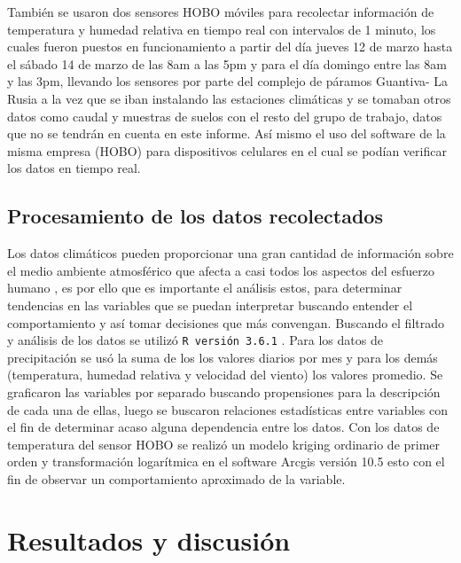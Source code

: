 \documentclass[conference,final,]{IEEEtran}
\begin{document}
También se usaron dos sensores HOBO móviles para recolectar información
de temperatura y humedad relativa en tiempo real con intervalos de 1
minuto, los cuales fueron puestos en funcionamiento a partir del día
jueves 12 de marzo hasta el sábado 14 de marzo de las 8am a las 5pm y
para el día domingo entre las 8am y las 3pm, llevando los sensores por
parte del complejo de páramos Guantiva- La Rusia a la vez que se iban
instalando las estaciones climáticas y se tomaban otros datos como
caudal y muestras de suelos con el resto del grupo de trabajo, datos que
no se tendrán en cuenta en este informe. Así mismo el uso del software
de la misma empresa (HOBO) para dispositivos celulares en el cual se
podían verificar los datos en tiempo real.

\hypertarget{procesamiento-de-los-datos-recolectados}{%
\subsection{Procesamiento de los datos
recolectados}\label{procesamiento-de-los-datos-recolectados}}

Los datos climáticos pueden proporcionar una gran cantidad de
información sobre el medio ambiente atmosférico que afecta a casi todos
los aspectos del esfuerzo humano \cite{Bala}, es por ello que es
importante el análisis estos, para determinar tendencias en las
variables que se puedan interpretar buscando entender el comportamiento
y así tomar decisiones que más convengan. Buscando el filtrado y
análisis de los datos se utilizó \texttt{R\ versión\ 3.6.1} \cite{Rs}. Para los
datos de precipitación se usó la suma de los los valores diarios por mes
y para los demás (temperatura, humedad relativa y velocidad del viento)
los valores promedio. Se graficaron las variables por separado buscando
propensiones para la descripción de cada una de ellas, luego se buscaron
relaciones estadísticas entre variables con el fin de determinar acaso
alguna dependencia entre los datos. Con los datos de temperatura del
sensor HOBO se realizó un modelo kriging ordinario de primer orden y
transformación logarítmica en el software Arcgis versión 10.5 esto con
el fin de observar un comportamiento aproximado de la variable.

\hypertarget{resultados-y-discusiuxf3n}{%
\section{Resultados y discusión}\label{resultados-y-discusiuxf3n}}
\end{document}

